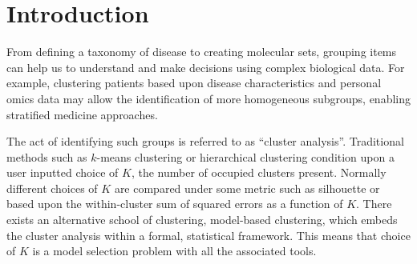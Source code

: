 \documentclass{bioinfo}
\begin{document}
\section{Introduction}

From defining a taxonomy of disease to creating molecular sets, grouping items can help us to understand and make decisions using complex biological data. For example, clustering patients based upon disease characteristics and personal omics data may allow the identification of more homogeneous subgroups, enabling stratified medicine approaches.



The act of identifying such groups is referred to as “cluster analysis”. Traditional methods such as $k$-means clustering \citep{lloyd1982least, forgy1965cluster} or hierarchical clustering condition upon a user inputted choice of $K$, the number of occupied clusters present. Normally different choices of $K$ are compared under some metric such as silhouette or based upon the within-cluster sum of squared errors as a function of $K$. There exists an alternative school of clustering, model-based clustering, which embeds the cluster analysis within a formal, statistical framework. This means that choice of $K$ is a model selection problem with all the associated tools. 
\end{document}
